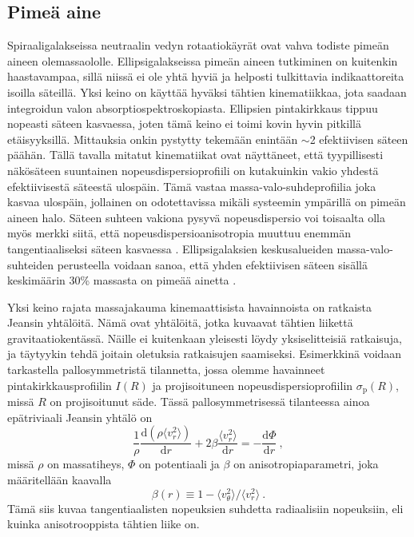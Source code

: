 \documentclass[12pt,a4paper]{article}
\begin{document}
\subsection{Pimeä aine}
Spiraaligalakseissa neutraalin vedyn rotaatiokäyrät ovat vahva todiste pimeän aineen olemassaololle. Ellipsigalakseissa pimeän aineen tutkiminen on kuitenkin haastavampaa, sillä niissä ei ole yhtä hyviä ja helposti tulkittavia indikaattoreita isoilla säteillä. Yksi keino on käyttää hyväksi tähtien kinematiikkaa, jota saadaan integroidun valon absorptiospektroskopiasta. Ellipsien pintakirkkaus tippuu nopeasti säteen kasvaessa, joten tämä keino ei toimi kovin hyvin pitkillä etäisyyksillä. Mittauksia onkin pystytty tekemään enintään $\sim$2 efektiivisen säteen päähän. Tällä tavalla mitatut kinematiikat ovat näyttäneet, että tyypillisesti näkösäteen suuntainen nopeusdispersioprofiili on kutakuinkin vakio yhdestä efektiivisestä säteestä ulospäin. Tämä vastaa massa-valo-suhdeprofiilia joka kasvaa ulospäin, jollainen on odotettavissa mikäli systeemin ympärillä on pimeän aineen halo. Säteen suhteen vakiona pysyvä nopeusdispersio voi toisaalta olla myös merkki siitä, että nopeusdispersioanisotropia muuttuu enemmän tangentiaaliseksi säteen kasvaessa \citep{marel:1993}. Ellipsigalaksien keskusalueiden massa-valo-suhteiden perusteella voidaan sanoa, että yhden efektiivisen säteen sisällä keskimäärin  30\% massasta on pimeää ainetta \citep{gerhard:2001, capellari:2006}.

Yksi keino rajata massajakauma kinemaattisista havainnoista on ratkaista Jeansin yhtälöi\-tä. Nämä ovat yhtälöitä, jotka kuvaavat tähtien liikettä gravitaatiokentässä. Näille ei kuitenkaan yleisesti löydy yksiselitteisiä ratkaisuja, ja täytyykin tehdä joitain oletuksia ratkaisujen saamiseksi. Esimerkkinä voidaan tarkastella pallosymmetristä tilannetta, jossa olemme havainneet pintakirkkausprofiilin $I(R)$ ja projisoituneen nopeusdispersioprofiilin $\sigma_\mathrm{p}(R)$, missä $R$ on projisoitunut säde. Tässä pallosymmetrisessä tilanteessa ainoa epätriviaali Jeansin yhtälö on
\begin{equation}
\frac{1}{\rho} \frac{\mathrm{d}(\rho \langle v_r^2 \rangle)}{\mathrm{d}r} + 2 \beta \frac{\langle v_r^2 \rangle}{\mathrm{d}r} = -\frac{\mathrm{d} \Phi}{\mathrm{d}r} \ ,
\end{equation}
missä $\rho$ on massatiheys, $\Phi$ on potentiaali ja $\beta$ on anisotropiaparametri, joka määritellään kaavalla
\begin{equation}
\beta(r) \equiv 1 - \langle v_\theta^2 \rangle / \langle v_r^2 \rangle \ .
\end{equation}
Tämä siis kuvaa tangentiaalisten nopeuksien suhdetta radiaalisiin nopeuksiin, eli kuinka anisotrooppista tähtien liike on.
\end{document}
